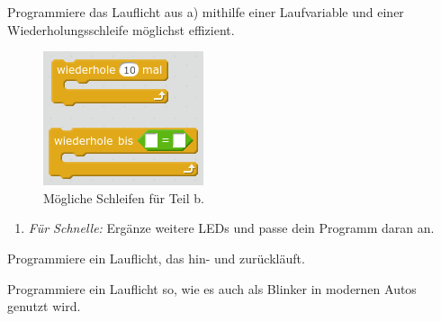 \begin{aufgabe}
\begin{minipage}{0.76\textwidth}
\begin{enumerate}[label=\alph*), itemsep=0ex, parsep=0ex,start=2]
			Programmiere das Lauflicht aus a) mithilfe einer Laufvariable und einer Wiederholungsschleife möglichst effizient.
		\end{enumerate}
	\end{minipage}
	\hfill
	\begin{minipage}{0.22\textwidth}
		\begin{figure}[H]
			\centering
			\includegraphics[width=\textwidth]{pics/schleifenvarianten.png}
			\caption{Mögliche Schleifen für Teil b.}
		\end{figure}
	\end{minipage}
	\begin{enumerate}[label=\alph*), itemsep=0ex, parsep=0ex,start=3]
		\item \emph{Für Schnelle:} Ergänze weitere LEDs und passe dein Programm daran an.
	\end{enumerate}
\end{aufgabe}

\begin{aufgabe}
	Programmiere ein Lauflicht, das hin- und zurückläuft.
\end{aufgabe}

\begin{projekt}\label{proj:blinker}
	Programmiere ein Lauflicht so, wie es auch als Blinker in modernen Autos genutzt wird.
\end{projekt}

